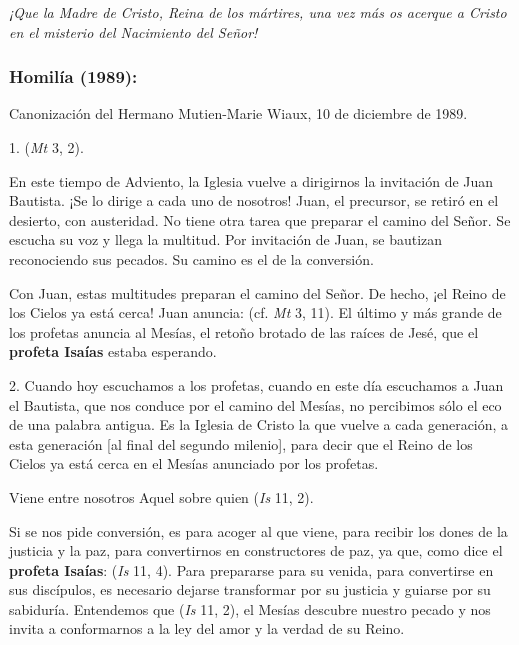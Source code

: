 \begin{body}
\begin{body}
	\emph{¡Que la Madre de Cristo, Reina de los mártires, una vez más os acerque a Cristo en el misterio del Nacimiento del Señor!}
\end{body}

\subsubsection{Homilía (1989):}

Canonización del Hermano Mutien-Marie Wiaux, 10 de diciembre de 1989.

\begin{body}
	1.  (\emph{Mt} 3, 2).
	
	En este tiempo de Adviento, la Iglesia vuelve a dirigirnos la invitación de Juan Bautista. ¡Se lo dirige a cada uno de nosotros! Juan, el precursor, se retiró en el desierto, con austeridad. No tiene otra tarea que preparar el camino del Señor. Se escucha su voz y llega la multitud. Por invitación de Juan, se bautizan reconociendo sus pecados. Su camino es el de la conversión.
	
	Con Juan, estas multitudes preparan el camino del Señor. De hecho, ¡el Reino de los Cielos ya está cerca! Juan anuncia:  (cf. \emph{Mt} 3, 11). El último y más grande de los profetas anuncia al Mesías, el retoño brotado de las raíces de Jesé, que el \textbf{profeta Isaías} estaba esperando.
	
	2. Cuando hoy escuchamos a los profetas, cuando en este día escuchamos a Juan el Bautista, que nos conduce por el camino del Mesías, no percibimos sólo el eco de una palabra antigua. Es la Iglesia de Cristo la que vuelve a cada generación, a esta generación {[}al final del segundo milenio{]}, para decir que el Reino de los Cielos ya está cerca en el Mesías anunciado por los profetas.
	
	Viene entre nosotros Aquel sobre quien  (\emph{Is} 11, 2).
	
	Si se nos pide conversión, es para acoger al que viene, para recibir los dones de la justicia y la paz, para convertirnos en constructores de paz, ya que, como dice el \textbf{profeta Isaías}:  (\emph{Is} 11, 4). Para prepararse para su venida, para convertirse en sus discípulos, es necesario dejarse transformar por su justicia y guiarse por su sabiduría. Entendemos que  (\emph{Is} 11, 2), el Mesías descubre nuestro pecado y nos invita a conformarnos a la ley del amor y la verdad de su Reino.
	

\end{body}
\end{body}
